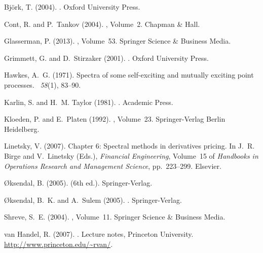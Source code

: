 \documentclass[12pt]{book}
\numberwithin{equation}{chapter}
\theoremstyle{plain}
\numberwithin{theorem}{section}
\theoremstyle{definition}
\numberwithin{exercise}{chapter}
\newcommand{\<}{\langle}
\renewcommand{\>}{\rangle}
\renewcommand{\(}{\left(}
\renewcommand{\)}{\right)}
\renewcommand{\[}{\left[}
\renewcommand{\]}{\right]}
\begin{document}
\begin{thebibliography}{}

Bj{\"o}rk, T. (2004).
.
\newblock Oxford University Press.

Cont, R. and P.~Tankov (2004).
, Volume~2.
\newblock Chapman \& Hall.

Glasserman, P. (2013).
, Volume~53.
\newblock Springer Science \& Business Media.

Grimmett, G. and D.~Stirzaker (2001).
.
\newblock Oxford University Press.

Hawkes, A.~G. (1971).
\newblock Spectra of some self-exciting and mutually exciting point processes.
~{\em 58\/}(1), 83--90.

Karlin, S. and H.~M. Taylor (1981).
.
\newblock Academic Press.

Kloeden, P. and E.~Platen (1992).
, Volume~23.
\newblock Springer-Verlag Berlin Heidelberg.

Linetsky, V. (2007).
\newblock Chapter 6: Spectral methods in derivatives pricing.
\newblock In J.~R. Birge and V.~Linetsky (Eds.), {\em Financial Engineering}, Volume~15 of {\em Handbooks in Operations Research and Management Science}, pp.\ 223--299. Elsevier.

{\O}ksendal, B. (2005).
 (6th ed.).
\newblock Springer-Verlag.

{\O}ksendal, B.~K. and A.~Sulem (2005).
.
\newblock Springer-Verlag.

Shreve, S.~E. (2004).
, Volume~11.
\newblock Springer Science \& Business Media.

van Handel, R. (2007).
.
\newblock Lecture notes, Princeton University. \url{http://www.princeton.edu/~rvan/}.

\end{thebibliography}
\end{document}

